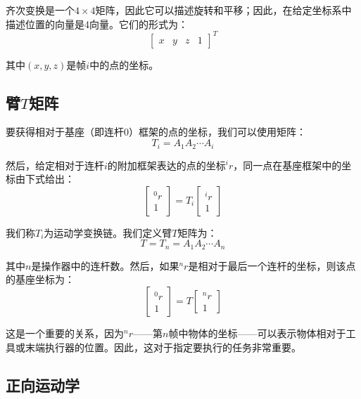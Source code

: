 \documentclass[UTF8,a4paper]{ctexart}
\begin{document}
齐次变换是一个$4\times 4$矩阵，因此它可以描述旋转和平移；因此，在给定坐标系中描述位置的向量是4向量。它们的形式为：
\begin{equation}
\begin{bmatrix} x & y & z & 1 \end{bmatrix}^T
\tag{A.2.4}
\end{equation}

其中$(x, y, z)$是帧$i$中的点的坐标。

\subsection{臂$T$矩阵}

要获得相对于基座（即连杆0）框架的点的坐标，我们可以使用矩阵：
\begin{equation}
T_i = A_1 A_2 \cdots A_i
\tag{A.2.7}
\end{equation}

然后，给定相对于连杆$i$的附加框架表达的点的坐标${}^ir$，同一点在基座框架中的坐标由下式给出：
\begin{equation}
\begin{bmatrix} {}^0r \\ 1 \end{bmatrix} = T_i \begin{bmatrix} {}^ir \\ 1 \end{bmatrix}
\tag{A.2.8}
\end{equation}

我们称$T_i$为运动学变换链。我们定义臂$T$矩阵为：
\begin{equation}
T = T_n = A_1 A_2 \cdots A_n
\tag{A.2.9}
\end{equation}

其中$n$是操作器中的连杆数。然后，如果${}^nr$是相对于最后一个连杆的坐标，则该点的基座坐标为：
\begin{equation}
\begin{bmatrix} {}^0r \\ 1 \end{bmatrix} = T \begin{bmatrix} {}^nr \\ 1 \end{bmatrix}
\tag{A.2.10}
\end{equation}

这是一个重要的关系，因为${}^nr$——第$n$帧中物体的坐标——可以表示物体相对于工具或末端执行器的位置。因此，这对于指定要执行的任务非常重要。

\subsection{正向运动学}
\end{document}
